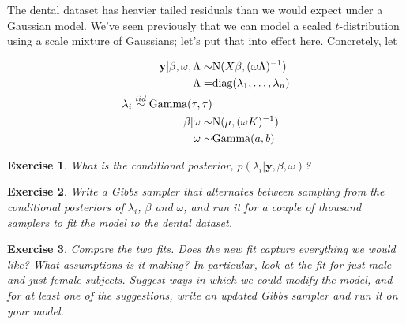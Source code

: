 \documentclass[twoside]{article}
\newcounter{lecnum}
\newtheorem{exercise}{Exercise}[lecnum]
\begin{document}
The dental dataset has heavier tailed residuals than we would expect under a Gaussian model. We've seen previously that we can model a scaled $t$-distribution using a scale mixture of Gaussians; let's put that into effect here. Concretely, let



$$\begin{aligned}
  \mathbf{y}|\beta,\omega,\Lambda \sim& \mbox{N}(X\beta, (\omega \Lambda)^{-1})\\
  \Lambda =& \mbox{diag}(\lambda_1,\dots, \lambda_n)\\
  \lambda_i \stackrel{\small{iid}}{\sim} \mbox{Gamma}(\tau,\tau)\\
  \beta|\omega \sim& \mbox{N}(\mu, (\omega K)^{-1})\\
  \omega \sim& \mbox{Gamma}(a,b)
\end{aligned}$$



\begin{exercise}

  What is the conditional posterior, $p(\lambda_i|\mathbf{y},\beta, \omega)$?

\end{exercise}



\begin{exercise}

  Write a Gibbs sampler that alternates between sampling from the conditional posteriors of $\lambda_i$, $\beta$ and $\omega$, and run it for a couple of thousand samplers to fit the model to the dental dataset. 

\end{exercise}



\begin{exercise}

  Compare the two fits. Does the new fit capture everything we would like? What assumptions is it making? In particular, look at the fit for just male and just female subjects. Suggest ways in which we could modify the model, and for at least one of the suggestions, write an updated Gibbs sampler and run it on your model.

\end{exercise}

  

  
\end{document}
